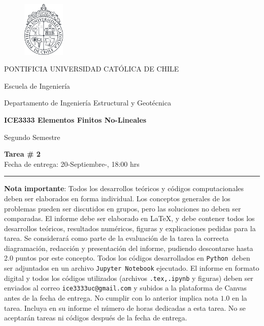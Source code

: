 \documentclass[11pt,letterpaper]{article}
\def\python{\mbox{\tt Python}}
\def\python{\mbox{\tt Python }}
\begin{document}
\begin{minipage}[t]{.14\textwidth}
	\vspace{-0.8cm}
	\begin{figure}[H]
	\centering
	\includegraphics[width=2cm]{LogoUC-BN.pdf}
	\end{figure}
\end{minipage}
\hfill
\begin{minipage}[t]{.85\textwidth}
\vspace{0.05cm}
	\begin{flushleft}
	PONTIFICIA UNIVERSIDAD CAT\'OLICA DE CHILE
	
	Escuela de Ingenier\'ia
	
	Departamento de Ingenier\'ia Estructural y Geot\'ecnica
	
	\textbf{ICE3333 Elementos Finitos No-Lineales}
	
	Segundo Semestre \the\year
	\end{flushleft}
\end{minipage}

\vspace{-10pt}
\begin{center}
\large
{\bf Tarea \# 2}\\
Fecha de entrega: 20-Septiembre-\the\year, 18:00 hrs
\rule{\linewidth}{0.4mm}

\end{center}

\vspace{-8pt}
\textbf{Nota importante}: Todos los desarrollos te\'oricos y c\'odigos computacionales deben ser elaborados en forma individual. Los conceptos generales de los problemas pueden ser discutidos en grupos, pero las soluciones no deben ser comparadas. El informe debe ser elaborado en \LaTeX, y debe contener todos los desarrollos te\'oricos, resultados num\'ericos, figuras y explicaciones pedidas para la tarea. Se considerar\'a como parte de la evaluaci\'on de la tarea la correcta diagramaci\'on, redacci\'on y presentaci\'on del informe, pudiendo descontarse hasta 2.0 puntos por este concepto. Todos los c\'odigos desarrollados en \python deben ser adjuntados en un archivo {\tt Jupyter Notebook} ejecutado. El informe en formato digital y todos los c\'odigos utilizados (archivos {\tt .tex,.ipynb} y figuras) deben ser enviados al correo {\tt ice3333uc@gmail.com} y subidos a la plataforma de
Canvas antes de la fecha de entrega. No cumplir con lo anterior implica nota $1.0$ en la tarea. Incluya en su informe el n\'umero de horas dedicadas a esta tarea. No se aceptar\'an tareas ni c\'odigos despu\'es de la fecha de entrega.
\end{document}
